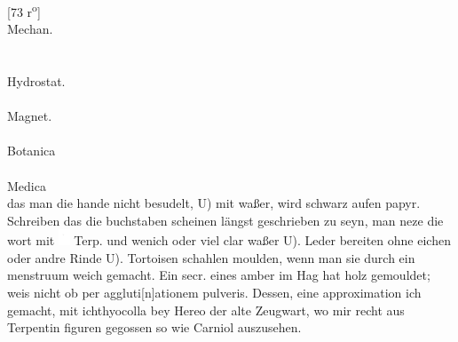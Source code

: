 [73 r\textsuperscript{o}] \\
Mechan.\\
\\
\\
Hydrostat.\\
\\
Magnet.\\
\\
Botanica\\
\\
Medica\\
\pend
\pstart {} das man die hande nicht besudelt, U) mit waßer, wird schwarz aufen papyr. Schreiben das die buchstaben scheinen l\"{a}ngst geschrieben zu seyn, man neze die wort mit \protect\includegraphics[width=0.025\textwidth]{images/oleum.pdf} Terp.\protect{} und wenich oder viel clar waßer U). Leder\protect{} bereiten ohne eichen\protect{} oder andre Rinde\protect{} U). Tortoisen\protect{} schahlen moulden, wenn man sie durch ein menstruum weich gemacht. Ein secr. eines   amber im Hag hat holz gemouldet; weis nicht ob per aggluti[n]ationem pulveris. Dessen, eine approximation ich gemacht, mit ichthyocolla\protect{} bey Hereo\protect{} der alte Zeugwart, wo mir recht aus Terpentin\protect{} figuren gegossen so wie Carniol\protect{} auszusehen.\pend